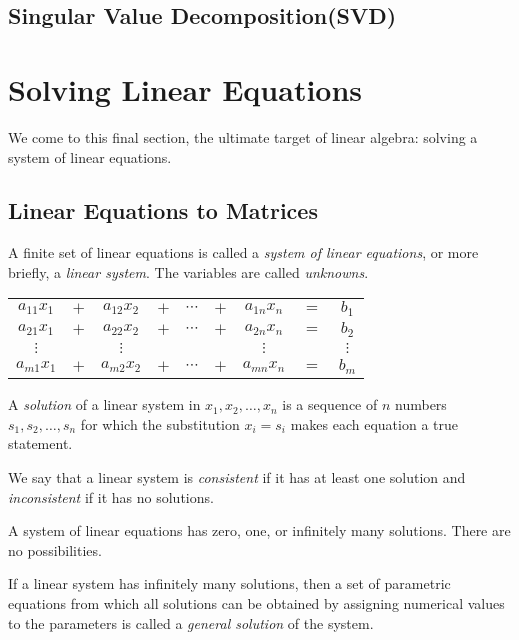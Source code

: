 \documentclass{report}
\begin{document}
		\subsection{Singular Value Decomposition(SVD)}%
	
	\section{Solving Linear Equations}
	We come to this final section, the ultimate target of linear algebra: solving a system of linear equations.
		\subsection{Linear Equations to Matrices}
		A finite set of linear equations is called a \emph{system of linear equations}, or more briefly, a \emph{linear system}. The variables are called \emph{unknowns}.
		
		\begin{center}
			\begin{tabular}{ccccccccc}
				$a_{11}x_1$ & $+$ & $a_{12}x_2$ & $+$ & $\cdots$ & $+$ & $a_{1n}x_n$ & $=$ & $b_1$    \\
				$a_{21}x_1$ & $+$ & $a_{22}x_2$ & $+$ & $\cdots$ & $+$ & $a_{2n}x_n$ & $=$ & $b_2$    \\
				$\vdots$    &     & $\vdots$   &     &          &     & $\vdots$    &     & $\vdots$ \\
				$a_{m1}x_1$ & $+$ & $a_{m2}x_2$ & $+$ & $\cdots$ & $+$ & $a_{mn}x_n$ & $=$ & $b_m$   
			\end{tabular}
		\end{center}
		
		A \emph{solution} of a linear system in $x_1,x_2,\dots,x_n$ is a sequence of $n$ numbers $s_1,s_2,\dots,s_n$ for which the substitution $x_i=s_i$ makes each equation a true statement.
		
		We say that a linear system is \emph{consistent} if it has at least one solution and \emph{inconsistent} if it has no solutions.
		
		\begin{thm}
			A system of linear equations has zero, one, or infinitely many solutions. There are no possibilities.
		\end{thm}
		
		If a linear system has infinitely many solutions, then a set of parametric equations from which all solutions can be obtained by assigning numerical values to the parameters is called a \emph{general solution} of the system.
		
\end{document}
